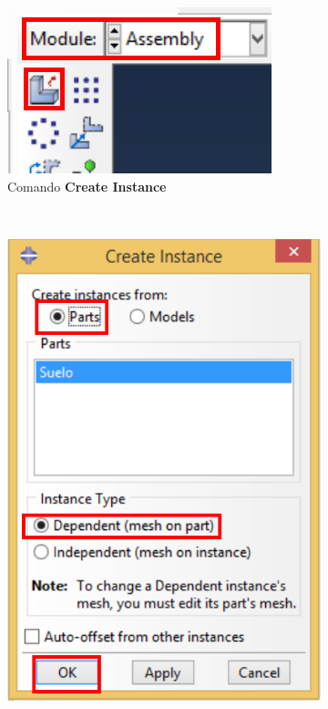   \begin{figure}[!h]
    \centering
    \begin{subfigure}[!h]{0.25\textwidth}
      \includegraphics[width=\textwidth]{./body/images/asse01.pdf}
      \caption{Comando \textbf{Create Instance}}
      \label{asse01}
    \end{subfigure}%
    ~ %
    \begin{subfigure}[!h]{0.39\textwidth}
      \includegraphics[width=\textwidth]{./body/images/asse02.pdf}

\end{subfigure}
\end{figure}
